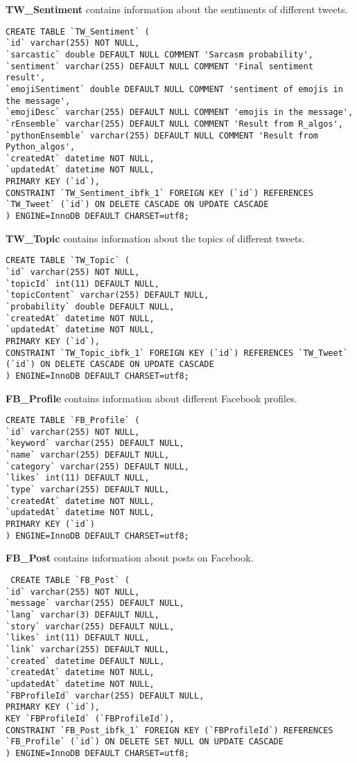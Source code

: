 \documentclass[]{article}
\begin{document}
\textbf{TW\_Sentiment} contains information about the sentiments of
different tweets.

\begin{verbatim}
CREATE TABLE `TW_Sentiment` (
`id` varchar(255) NOT NULL,
`sarcastic` double DEFAULT NULL COMMENT 'Sarcasm probability',
`sentiment` varchar(255) DEFAULT NULL COMMENT 'Final sentiment result',
`emojiSentiment` double DEFAULT NULL COMMENT 'sentiment of emojis in the message',
`emojiDesc` varchar(255) DEFAULT NULL COMMENT 'emojis in the message',
`rEnsemble` varchar(255) DEFAULT NULL COMMENT 'Result from R_algos',
`pythonEnsemble` varchar(255) DEFAULT NULL COMMENT 'Result from Python_algos',
`createdAt` datetime NOT NULL,
`updatedAt` datetime NOT NULL,
PRIMARY KEY (`id`),
CONSTRAINT `TW_Sentiment_ibfk_1` FOREIGN KEY (`id`) REFERENCES `TW_Tweet` (`id`) ON DELETE CASCADE ON UPDATE CASCADE
) ENGINE=InnoDB DEFAULT CHARSET=utf8;
\end{verbatim}

\textbf{TW\_Topic} contains information about the topics of different
tweets.

\begin{verbatim}
CREATE TABLE `TW_Topic` (
`id` varchar(255) NOT NULL,
`topicId` int(11) DEFAULT NULL,
`topicContent` varchar(255) DEFAULT NULL,
`probability` double DEFAULT NULL,
`createdAt` datetime NOT NULL,
`updatedAt` datetime NOT NULL,
PRIMARY KEY (`id`),
CONSTRAINT `TW_Topic_ibfk_1` FOREIGN KEY (`id`) REFERENCES `TW_Tweet` (`id`) ON DELETE CASCADE ON UPDATE CASCADE
) ENGINE=InnoDB DEFAULT CHARSET=utf8;
\end{verbatim}

\textbf{FB\_Profile} contains information about different Facebook
profiles.

\begin{verbatim}
CREATE TABLE `FB_Profile` (
`id` varchar(255) NOT NULL,
`keyword` varchar(255) DEFAULT NULL,
`name` varchar(255) DEFAULT NULL,
`category` varchar(255) DEFAULT NULL,
`likes` int(11) DEFAULT NULL,
`type` varchar(255) DEFAULT NULL,
`createdAt` datetime NOT NULL,
`updatedAt` datetime NOT NULL,
PRIMARY KEY (`id`)
) ENGINE=InnoDB DEFAULT CHARSET=utf8;
\end{verbatim}

\textbf{FB\_Post} contains information about posts on Facebook.

\begin{verbatim}
 CREATE TABLE `FB_Post` (
`id` varchar(255) NOT NULL,
`message` varchar(255) DEFAULT NULL,
`lang` varchar(3) DEFAULT NULL,
`story` varchar(255) DEFAULT NULL,
`likes` int(11) DEFAULT NULL,
`link` varchar(255) DEFAULT NULL,
`created` datetime DEFAULT NULL,
`createdAt` datetime NOT NULL,
`updatedAt` datetime NOT NULL,
`FBProfileId` varchar(255) DEFAULT NULL,
PRIMARY KEY (`id`),
KEY `FBProfileId` (`FBProfileId`),
CONSTRAINT `FB_Post_ibfk_1` FOREIGN KEY (`FBProfileId`) REFERENCES `FB_Profile` (`id`) ON DELETE SET NULL ON UPDATE CASCADE
) ENGINE=InnoDB DEFAULT CHARSET=utf8;
\end{verbatim}
\end{document}
